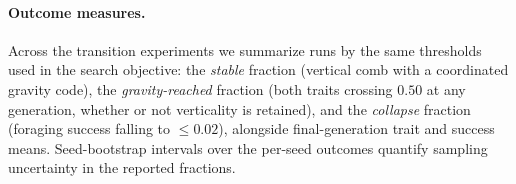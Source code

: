 \paragraph{Outcome measures.}
Across the transition experiments we summarize runs by the same thresholds used in
the search objective: the \emph{stable} fraction (vertical comb with a coordinated
gravity code), the \emph{gravity-reached} fraction (both  traits
crossing $0.50$ at any generation, whether or not verticality is retained), and
the \emph{collapse} fraction (foraging success falling to $\le 0.02$), alongside
final-generation trait and success means. Seed-bootstrap intervals over the
per-seed outcomes quantify sampling uncertainty in the reported fractions.
